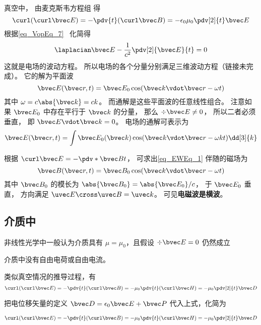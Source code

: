 
\begin{issues}
\issueDraft
{}
\end{issues}


真空中， 由麦克斯韦方程组 得
\begin{equation}
\curl(\curl\bvec E) = -\pdv{t} (\curl\bvec B) = -\epsilon_0\mu_0 \pdv[2]{t} \bvec E
\end{equation}
根据\autoref{eq_VopEq_7}~ 化简得
\begin{equation}
\laplacian \bvec E - \frac{1}{c^2} \pdv[2]{\bvec E}{t} = 0
\end{equation}
这就是电场的波动方程。 所以电场的各个分量分别满足三维波动方程（链接未完成）。 它的解为平面波
\begin{equation}\label{eq_EWEq_1}
\bvec E(\bvec r, t) = \bvec E_0 \cos(\bvec k\vdot \bvec r - \omega t)
\end{equation}
其中 $\omega = c\abs{\bvec k} = ck$。 而通解是这些平面波的任意线性组合。 注意如果 $\bvec E_0$ 中存在平行于 $\bvec k$ 的分量， 那么 $\div \bvec E \ne 0$， 所以二者必须垂直， 即 $\bvec E \vdot \bvec k = 0$。 电场的通解可表示为
\begin{equation}
\bvec E(\bvec r, t) = \int \bvec E_0(\bvec k) \cos(\bvec k\vdot \bvec r - \omega k t) \dd[3]{k}
\end{equation}

根据 $\curl \bvec E = -\pdv*{\bvec B}{t}$， 可求出\autoref{eq_EWEq_1} 伴随的磁场为
\begin{equation}
\bvec B(\bvec r, t) = \bvec B_0 \cos(\bvec k \vdot \bvec r - \omega t)
\end{equation}
其中 $\bvec B_0$ 的模长为 $\abs{\bvec B_0} = \abs{\bvec E_0}/c$， 于 $\bvec E_0$ 垂直， 方向满足 $\uvec E \cross \uvec B = \uvec k$。 可见\textbf{电磁波是横波}。

\subsection{介质中}

非线性光学中一般认为介质具有 $\mu = \mu_0$，且假设 $\div\bvec E = 0$ 仍然成立

介质中没有自由电荷或自由电流。

类似真空情况的推导过程，有
\begin{equation}
\curl(\curl\bvec E) = -\pdv{t} (\curl\bvec B) = -\mu_0 \pdv{t} (\curl\bvec H)
= -\mu_0 \pdv[2]{t} \bvec D
\end{equation}

把电位移矢量的定义 $\bvec D = \epsilon_0\bvec E + \bvec P$ 代入上式，化简为

\begin{equation}
\curl(\curl\bvec E) = -\pdv{t} (\curl\bvec B) = -\mu_0 \pdv{t} (\curl\bvec H)
= -\mu_0 \pdv[2]{t} \bvec D
\end{equation}